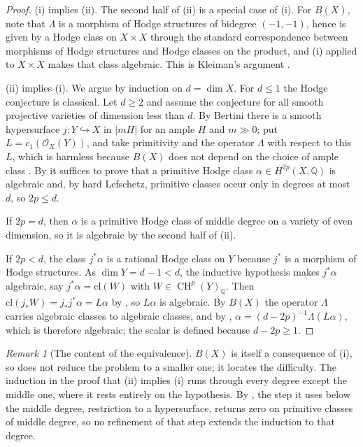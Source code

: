 \documentclass[11pt,reqno]{amsart}
\theoremstyle{plain}
\theoremstyle{definition}
\theoremstyle{remark}
\newtheorem{remark}[theorem]{Remark}
\newcommand{\QQ}{\mathbb{Q}}
\newcommand{\cO}{\mathcal{O}}
\newcommand{\cl}{\mathrm{cl}}
\DeclareMathOperator{\CH}{CH}
\begin{document}
\begin{proof}
(i) implies (ii). The second half of (ii) is a special case of (i). For
$B(X)$, note that $\Lambda$ is a morphism of Hodge structures of bidegree
$(-1,-1)$, hence is given by a Hodge class on $X\times X$ through the
standard correspondence between morphisms of Hodge structures and Hodge
classes on the product, and (i) applied to $X\times X$ makes that class
algebraic. This is Kleiman's argument \cite[\S2]{Kle68}.

(ii) implies (i). We argue by induction on $d=\dim X$. For $d\le1$ the Hodge
conjecture is classical. Let $d\ge2$ and assume the conjecture for all smooth
projective varieties of dimension less than $d$. By Bertini there is a smooth
hypersurface $j\colon Y\hookrightarrow X$ in $|mH|$ for an ample $H$ and
$m\gg0$; put $L=c_{1}(\cO_{X}(Y))$, and take primitivity and the operator
$\Lambda$ with respect to this $L$, which is harmless because $B(X)$ does not
depend on the choice of ample class \cite{Kle68,Kle94}. By
 it suffices to prove that a primitive Hodge class
$\alpha\in H^{2p}(X,\QQ)$ is algebraic and, by hard Lefschetz, primitive
classes occur only in degrees at most $d$, so $2p\le d$.

If $2p=d$, then $\alpha$ is a primitive Hodge class of middle degree on a
variety of even dimension, so it is algebraic by the second half of (ii).

If $2p<d$, the class $j^{*}\alpha$ is a rational Hodge class on $Y$ because
$j^{*}$ is a morphism of Hodge structures. As $\dim Y=d-1<d$, the inductive
hypothesis makes $j^{*}\alpha$ algebraic, say $j^{*}\alpha=\cl(W)$ with
$W\in\CH^{p}(Y)_{\QQ}$. Then
$\cl(j_{*}W)=j_{*}j^{*}\alpha=L\alpha$ by , so
$L\alpha$ is algebraic. By $B(X)$ the operator $\Lambda$ carries algebraic
classes to algebraic classes, and by ,
$\alpha=(d-2p)^{-1}\Lambda(L\alpha)$, which is therefore algebraic; the scalar
is defined because $d-2p\ge1$.
\end{proof}

\begin{remark}[The content of the equivalence]\label{rem:notsimpler}
$B(X)$ is itself a consequence of (i), so
 does not reduce the problem to a smaller one; it
locates the difficulty. The induction in the proof that (ii) implies (i) runs
through every degree except the middle one, where it rests entirely on the
hypothesis. By , the step it uses below the middle
degree, restriction to a hypersurface, returns zero on primitive classes of
middle degree, so no refinement of that step extends the induction to that
degree.
\end{remark}
\end{document}
